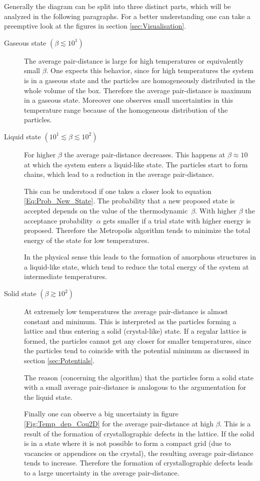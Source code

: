 \documentclass[11pt, a4paper]{article}
\numberwithin{equation}{section}
\begin{document}
Generally the diagram can be split into three distinct parts, which will be analyzed in the following paragraphs.
For a better understanding one can take a preemptive look at the figures in section \ref{sec:Visualisation}.
\begin{description}
	\item[Gaseous state $(\beta \lesssim 10^1)$] 
		The average pair-distance is large for high temperatures or equivalently small $\beta$.
		One expects this behavior, since for high temperatures the system is in a gaseous state and the particles are homogeneously distributed in the whole volume of the box.
		Therefore the average pair-distance is maximum in a gaseous state.
		Moreover one observes small uncertainties in this temperature range because of the homogeneous distribution of the particles.
	
	\item[Liquid state $(10^1 \lesssim \beta \lesssim 10^2)$]
		For higher $\beta$ the average pair-distance decreases.
		This happens at $\beta \approx 10$ at which the system enters a liquid-like state.
		The particles start to form chains, which lead to a reduction in the average pair-distance.
		
		This can be understood if one takes a closer look to equation \ref{Eq:Prob_New_State}.
		The probability that a new proposed state is accepted depends on the value of the thermodynamic~$\beta$.
		With higher $\beta$ the acceptance probability~$\alpha$ gets smaller if a trial state with higher energy is proposed.
		Therefore the Metropolis algorithm tends to minimize the total energy of the state for low temperatures.
		
		In the physical sense this leads to the formation of amorphous structures in a liquid-like state, which tend to reduce the total energy of the system at intermediate temperatures.		
		
	\item[Solid state $(\beta \gtrsim 10^2)$]
		At extremely low temperatures the average pair-distance is almost constant and minimum.
		This is interpreted as the particles forming a lattice and thus entering a solid (crystal-like) state.
		If a regular lattice is formed, the particles cannot get any closer for smaller temperatures, since the particles tend to coincide with the potential minimum as discussed in section \ref{sec:Potentials}.
		
		The reason (concerning the algorithm) that the particles form a solid state with a small average pair-distance is analogous to the argumentation for the liquid state.
		
		Finally one can observe a big uncertainty in figure \ref{Fig:Temp_dep_Cou2D} for the average pair-distance at high $\beta$.
		This is a result of the formation of crystallographic defects in the lattice.
		If the solid is in a state where it is not possible to form a compact grid (due to vacancies or appendices on the crystal), the resulting average pair-distance tends to increase.
		Therefore the formation of crystallographic defects leads to a large uncertainty in the average pair-distance.
\end{description}
\end{document}
